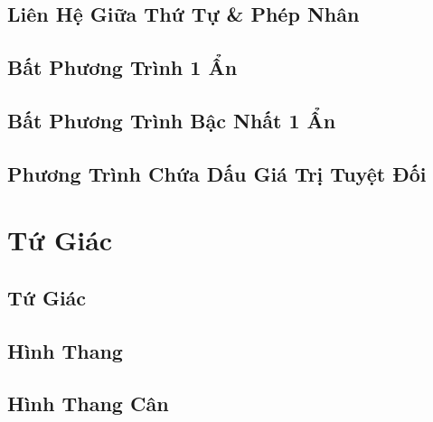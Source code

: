\documentclass{article}
\numberwithin{equation}{section}
\begin{document}
\subsection{Liên Hệ Giữa Thứ Tự \& Phép Nhân}


\subsection{Bất Phương Trình 1 Ẩn}


\subsection{Bất Phương Trình Bậc Nhất 1 Ẩn}


\subsection{Phương Trình Chứa Dấu Giá Trị Tuyệt Đối}


\section{Tứ Giác}

\subsection{Tứ Giác}



\subsection{Hình Thang}


\subsection{Hình Thang Cân}
\end{document}
